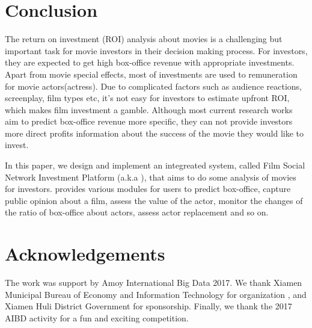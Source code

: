 \section{Conclusion}
\label{sec:conclu}
The return on investment (ROI) analysis about movies is a challenging but important task for movie investors in their decision making process. For investors, they are expected to get high box-office revenue with appropriate investments. Apart from movie special effects, most of investments are used to remuneration for movie actors(actress). Due to complicated factors such as audience reactions, screenplay, film types etc, it's not easy for investors to estimate upfront ROI, which makes film investment a gamble. Although most current research works aim to predict box-office revenue more specific, they can not provide investors more direct profits information about the success of the movie they would like to invest.
\par In this paper, we design and implement an integreated system, called Film Social Network Investment Platform (a.k.a \system), that aims to do some analysis of movies for investors. \system provides various modules for users to predict box-office, capture public opinion about a film, assess the value of the actor, monitor the changes of the ratio of box-office about actors, assess actor replacement and so on.
\section{Acknowledgements}
The work was support by Amoy International Big Data 2017. We thank Xiamen Municipal Bureau of Economy and Information Technology for organization , and Xiamen Huli District Government for sponsorship. Finally, we thank the 2017 AIBD activity for a fun and exciting competition. 